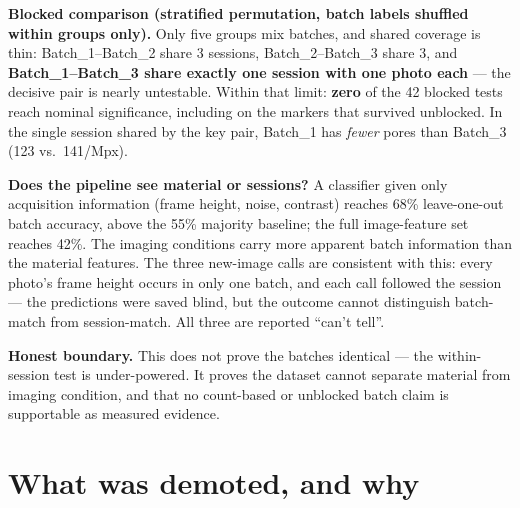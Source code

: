 \documentclass[10pt,a4paper]{article}
\begin{document}
\textbf{Blocked comparison (stratified permutation, batch labels shuffled
within groups only).} Only five groups mix batches, and shared coverage is
thin: Batch\_1--Batch\_2 share 3
sessions, Batch\_2--Batch\_3 share 3,
and \textbf{Batch\_1--Batch\_3 share exactly one session with one photo
each} --- the decisive pair is nearly untestable. Within that limit:
\textbf{zero} of the 42 blocked tests
reach nominal significance, including on the markers that survived
unblocked. In the single session shared by the key pair, Batch\_1 has
\emph{fewer} pores than Batch\_3 (123 vs.\ 141/Mpx).

\textbf{Does the pipeline see material or sessions?} A classifier given
only acquisition information (frame height, noise, contrast) reaches 68\%
leave-one-out batch accuracy, above the 55\% majority baseline; the full
image-feature set reaches 42\%. The imaging conditions carry more
apparent batch information than the material features. The three
new-image calls are consistent with this: every photo's frame height
occurs in only one batch, and each call followed the session --- the
predictions were saved blind, but the outcome cannot distinguish
batch-match from session-match. All three are reported ``can't tell''.

\textbf{Honest boundary.} This does not prove the batches identical ---
the within-session test is under-powered. It proves the dataset cannot
separate material from imaging condition, and that no count-based or
unblocked batch claim is supportable as measured evidence.

\section{What was demoted, and why}
\label{sec:demoted}
\end{document}
